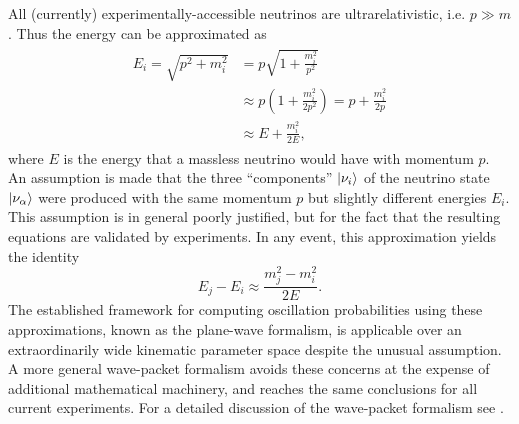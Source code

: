 All (currently) experimentally-accessible neutrinos are ultrarelativistic,
i.e. $p \gg m$.
Thus the energy can be approximated as
\begin{align}\label{eq:energy_approx}
    \begin{split}
        E_i = \sqrt{p^2 + m_i^2}
        &= p\sqrt{1 + \frac{m_i^2}{p^2}} \\
        &\approx p\left(1 + \frac{m_i^2}{2p^2}\right) = p + \frac{m_i^2}{2p} \\
        &\approx E + \frac{m_i^2}{2E},
    \end{split}
\end{align}
where $E$ is the energy that a massless neutrino would have with momentum $p$.
An assumption is made that the three ``components'' $\ket{\nu_i}$
of the neutrino state $\ket{\nu_\alpha}$
were produced with the same momentum $p$ but slightly different energies $E_i$.
This assumption is in general poorly justified,
but for the fact that the resulting equations are validated by experiments.
In any event, this approximation yields the identity
\begin{equation}\label{eq:msq_approx}
    E_j - E_i \approx \frac{m_j^2 - m_i^2}{2E}.
\end{equation}
The established framework for computing oscillation probabilities
using these approximations, known as the plane-wave formalism,
is applicable over an extraordinarily wide
kinematic parameter space despite the unusual assumption.
A more general wave-packet formalism avoids these concerns
at the expense of additional mathematical machinery,
and reaches the same conclusions for all current experiments.
For a detailed discussion of the wave-packet formalism see
\cite[Ch.~8 of][]{neutrino_textbook}.

